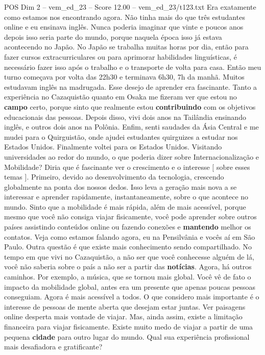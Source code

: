 \begin{textsample}{POS Dim 2 – vem\_ed\_23 – Score 12.00 – vem\_ed\_23/t123.txt}
Era exatamente como estamos nos encontrando agora.
Não tinha mais do que três estudantes online e eu ensinava inglês.
Nunca poderia imaginar que vinte e poucos anos depois isso seria parte do mundo, porque naquela época isso já estava acontecendo no Japão.
No Japão se trabalha muitas horas por dia, então para fazer cursos extracurriculares ou para aprimorar habilidades linguísticas, é necessário fazer isso após o trabalho e o transporte de volta para casa.
Então meu turno começava por volta das 22h30 e terminava 6h30, 7h da manhã.
Muitos estudavam inglês na madrugada.
Esse desejo de aprender era fascinante.
Tanto a experiência no Cazaquistão quanto em Osaka me fizeram ver que estou no \textbf{campo} certo, porque sinto que realmente estou \textbf{contribuindo} com os objetivos educacionais das pessoas.
Depois disso, vivi dois anos na Tailândia ensinando inglês, e outros dois anos na Polônia.
Enfim, senti saudades da Ásia Central e me mudei para o Quirguistão, onde ajudei estudantes quirguizes a estudar nos Estados Unidos.
Finalmente voltei para os Estados Unidos.
Visitando universidades ao redor do mundo, o que poderia dizer sobre Internacionalização e Mobilidade?
Diria que é fascinante ver o crescimento e o interesse [ sobre esses temas ].
Primeiro, devido ao desenvolvimento da tecnologia, crescendo globalmente na ponta dos nossos dedos.
Isso leva a geração mais nova a se interessar e aprender rapidamente, instantaneamente, sobre o que acontece no mundo.
Sinto que a mobilidade é mais rápida, além de mais acessível, porque mesmo que você não consiga viajar fisicamente, você pode aprender sobre outros países assistindo conteúdos online ou fazendo conexões e \textbf{mantendo} melhor os contatos.
Veja como estamos falando agora, eu na Pensilvânia e vocês aí em São Paulo.
Outra questão é que existe mais conhecimento sendo compartilhado.
No tempo em que vivi no Cazaquistão, a não ser que você conhecesse alguém de lá, você não saberia sobre o país a não ser a partir das \textbf{notícias}.
Agora, há outros caminhos.
Por exemplo, a música, que se tornou mais global.
Você vê de fato o impacto da mobilidade global, antes era um presente que apenas poucas pessoas conseguiam.
Agora é mais acessível a todos.
O que considero mais importante é o interesse de pessoas de mente aberta que desejam estar juntas.
Ver paisagens online desperta mais vontade de viajar.
Mas, ainda assim, existe a limitação financeira para viajar fisicamente.
Existe muito medo de viajar a partir de uma pequena \textbf{cidade} para outro lugar do mundo.
Qual sua experiência profissional mais desafiadora e gratificante?

\end{textsample}
